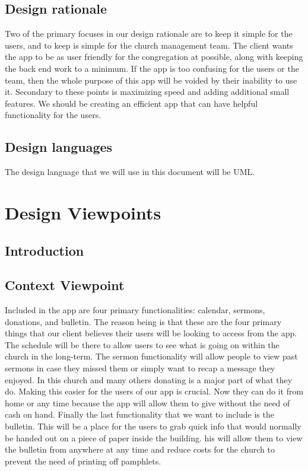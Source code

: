 \documentclass[letterpaper,10pt,draftclsnofoot,onecolumn,titlepage]{IEEEtran}
\begin{document}
		\subsection{Design rationale}
		Two of the primary focuses in our design rationale are to keep it simple for the users, and to keep is simple for the church management team.
		The client wants the app to be as user friendly for the congregation at possible, along with keeping the back end work to a minimum.
		If the app is too confusing for the users or the team, then the whole purpose of this app will be voided by their inability to use it.
		Secondary to these points is maximizing speed and adding additional small features.
		We should be creating an efficient app that can have helpful functionality for the users.

		\subsection{Design languages}
		The design language that we will use in this document will be UML.

	\section{Design Viewpoints}

		\subsection{Introduction}

		\subsection{Context Viewpoint}
		Included in the app are four primary functionalities: calendar, sermons, donations, and bulletin.
		The reason being is that these are the four primary things that our client believes their users will be looking to access from the app.
		The schedule will be there to allow users to see what is going on within the church in the long-term.
		The sermon functionality will allow people to view past sermons in case they missed them or simply want to recap a message they enjoyed.
		In this church and many others donating is a major part of what they do.
		Making this easier for the users of our app is crucial.
		Now they can do it from home or any time because the app will allow them to give without the need of cash on hand.
		Finally the last functionality that we want to include is the bulletin.
		This will be a place for the users to grab quick info that would normally be handed out on a piece of paper inside the building.
		his will allow them to view the bulletin from anywhere at any time and reduce costs for the church to prevent the need of printing off pamphlets.
\end{document}
